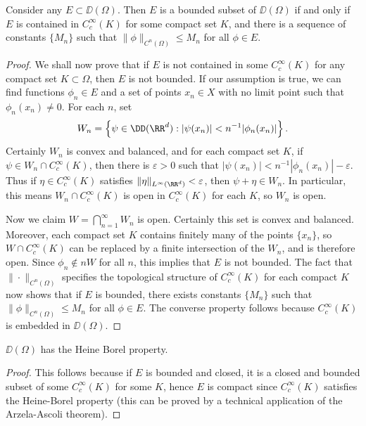 \begin{theorem}
    Consider any $E \subset \DD(\Omega)$. Then $E$ is a bounded subset of $\DD(\Omega)$ if and only if $E$ is contained in $C_c^\infty(K)$ for some compact set $K$, and there is a sequence of constants $\{ M_n \}$ such that $\| \phi \|_{C^n(\Omega)} \leq M_n$ for all $\phi \in E$.
\end{theorem}
\begin{proof}
    We shall now prove that if $E$ is not contained in some $C_c^\infty(K)$ for any compact set $K \subset \Omega$, then $E$ is not bounded. If our assumption is true, we can find functions $\phi_n \in E$ and a set of points $x_n \in X$ with no limit point such that $\phi_n(x_n) \neq 0$. For each $n$, set
    \[ W_n = \left\{ \psi \in \DD(\RR^d): |\psi(x_n)| < n^{-1} |\phi_n(x_n)| \right\}. \]
    Certainly $W_n$ is convex and balanced, and for each compact set $K$, if $\psi \in W_n \cap C_c^\infty(K)$, then there is $\varepsilon > 0$ such that $|\psi(x_n)| < n^{-1} |\phi_n(x_n)| - \varepsilon$. Thus if $\eta \in C_c^\infty(K)$ satisfies $\| \eta \|_{L^\infty(\RR^d)} < \varepsilon$, then $\psi + \eta \in W_n$. In particular, this means $W_n \cap C_c^\infty(K)$ is open in $C_c^\infty(K)$ for each $K$, so $W_n$ is open.

    Now we claim $W = \bigcap_{n = 1}^\infty W_n$ is open. Certainly this set is convex and balanced. Moreover, each compact set $K$ contains finitely many of the points $\{ x_n \}$, so $W \cap C_c^\infty(K)$ can be replaced by a finite intersection of the $W_n$, and is therefore open. Since $\phi_n \not \in nW$ for all $n$, this implies that $E$ is not bounded. The fact that $\| \cdot \|_{C^n(\Omega)}$ specifies the topological structure of $C_c^\infty(K)$ for each compact $K$ now shows that if $E$ is bounded, there exists constants $\{ M_n \}$ such that $\| \phi \|_{C^n(\Omega)} \leq M_n$ for all $\phi \in E$. The converse property follows because $C_c^\infty(K)$ is embedded in $\DD(\Omega)$.
\end{proof}

\begin{corollary}
    $\DD(\Omega)$ has the Heine Borel property.
\end{corollary}
\begin{proof}
    This follows because if $E$ is bounded and closed, it is a closed and bounded subset of some $C_c^\infty(K)$ for some $K$, hence $E$ is compact since $C_c^\infty(K)$ satisfies the Heine-Borel property (this can be proved by a technical application of the Arzela-Ascoli theorem).
\end{proof}

